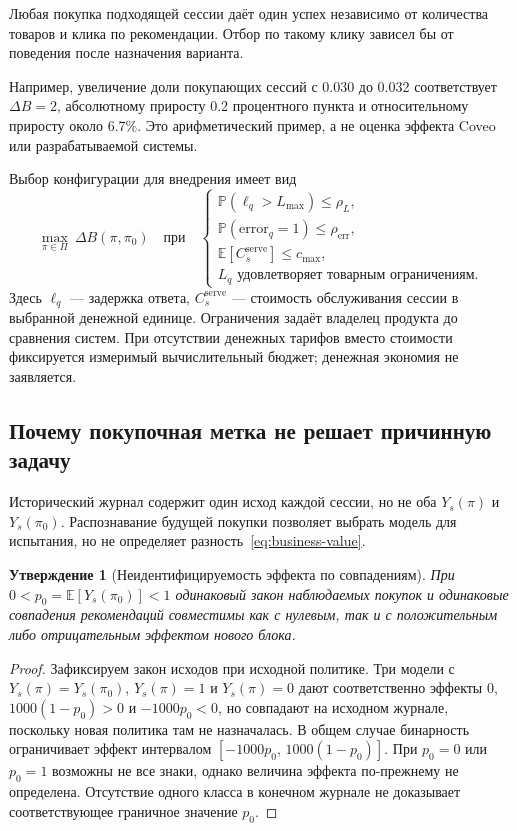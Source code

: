 \documentclass[12pt,a4paper]{article}
\newcommand{\E}{\mathbb E}
\newcommand{\Prob}{\mathbb P}
\theoremstyle{plainru}
\newtheorem{proposition}{Утверждение}[section]
\begin{document}
Любая покупка подходящей сессии даёт один успех независимо от количества
товаров и клика по рекомендации. Отбор по такому клику зависел бы
от поведения после назначения варианта.

Например, увеличение доли покупающих сессий с 0.030 до 0.032
соответствует \(\Delta B=2\), абсолютному приросту 0.2 процентного
пункта и относительному приросту около 6.7\%. Это арифметический пример,
а не оценка эффекта Coveo или разрабатываемой системы.

Выбор конфигурации для внедрения имеет вид
\begin{equation}\label{eq:business-optimization}
\max_{\pi\in\Pi}\ \Delta B(\pi,\pi_0)
\quad\text{при}\quad
\begin{cases}
\Prob(\ell_q>L_{\max})\le\rho_L,\\
\Prob(\mathrm{error}_q=1)\le\rho_{\mathrm{err}},\\
\E[C_s^{\mathrm{serve}}]\le c_{\max},\\
L_q\text{ удовлетворяет товарным ограничениям}.
\end{cases}
\end{equation}
Здесь \(\ell_q\) --- задержка ответа, \(C_s^{\mathrm{serve}}\) ---
стоимость обслуживания сессии в выбранной денежной единице.
Ограничения задаёт владелец продукта до сравнения систем.
При отсутствии денежных тарифов вместо стоимости фиксируется
измеримый вычислительный бюджет; денежная экономия не заявляется.

\subsection{Почему покупочная метка не решает причинную задачу}

Исторический журнал содержит один исход каждой сессии,
но не оба \(Y_s(\pi)\) и \(Y_s(\pi_0)\). Распознавание будущей покупки
позволяет выбрать модель для испытания, но не определяет
разность~\eqref{eq:business-value}.

\begin{proposition}[Неидентифицируемость эффекта по совпадениям]\label{prop:business-nonidentification}
При $0<p_0=\E[Y_s(\pi_0)]<1$ одинаковый закон наблюдаемых покупок
и одинаковые совпадения рекомендаций совместимы как с нулевым,
так и с положительным либо отрицательным эффектом нового блока.
\end{proposition}
\begin{proof}
Зафиксируем закон исходов при исходной политике. Три модели с
$Y_s(\pi)=Y_s(\pi_0)$, $Y_s(\pi)=1$ и $Y_s(\pi)=0$ дают соответственно
эффекты $0$, $1000(1-p_0)>0$ и $-1000p_0<0$, но совпадают на исходном
журнале, поскольку новая политика там не назначалась.
В общем случае бинарность ограничивает эффект интервалом
$[-1000p_0,\,1000(1-p_0)]$. При $p_0=0$ или $p_0=1$ возможны не все
знаки, однако величина эффекта по-прежнему не определена.
Отсутствие одного класса в конечном журнале не доказывает
соответствующее граничное значение $p_0$.
\end{proof}
\end{document}
